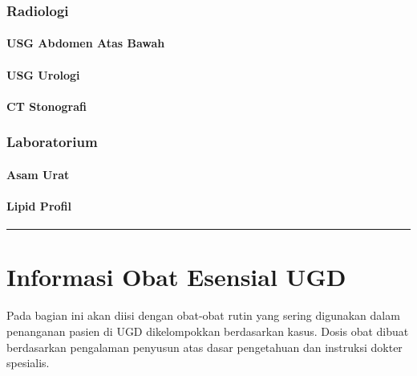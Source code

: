 \documentclass[
]{book}
\begin{document}
\hypertarget{radiologi}{%
\subsection{Radiologi}\label{radiologi}}

\hypertarget{usg-abdomen-atas-bawah}{%
\subsubsection{USG Abdomen Atas Bawah}\label{usg-abdomen-atas-bawah}}

\hypertarget{usg-urologi}{%
\subsubsection{USG Urologi}\label{usg-urologi}}

\hypertarget{ct-stonografi}{%
\subsubsection{CT Stonografi}\label{ct-stonografi}}

\hypertarget{laboratorium}{%
\subsection{Laboratorium}\label{laboratorium}}

\hypertarget{asam-urat}{%
\subsubsection{Asam Urat}\label{asam-urat}}

\hypertarget{lipid-profil}{%
\subsubsection{Lipid Profil}\label{lipid-profil}}

\begin{center}\rule{0.5\linewidth}{0.5pt}\end{center}

\hypertarget{informasi-obat-esensial-ugd}{%
\chapter{Informasi Obat Esensial UGD}\label{informasi-obat-esensial-ugd}}

Pada bagian ini akan diisi dengan obat-obat rutin yang sering digunakan dalam penanganan pasien di UGD dikelompokkan berdasarkan kasus. Dosis obat dibuat berdasarkan pengalaman penyusun atas dasar pengetahuan dan instruksi dokter spesialis.
\end{document}
